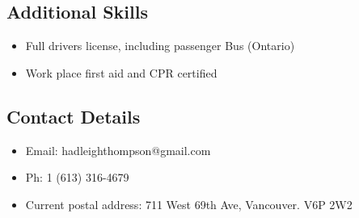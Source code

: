 \documentclass[]{article}
\begin{document}
\subsection*{Additional Skills}
\begin{itemize}
\item Full drivers license, including passenger Bus (Ontario)
\item Work place first aid and CPR certified
\end{itemize}

\subsection*{Contact Details}
\begin{itemize}
\item Email: hadleighthompson@gmail.com
\item Ph: 1 (613) 316-4679
\item Current postal address: 711 West 69th Ave, Vancouver. V6P 2W2
\end{itemize}
\end{document}
